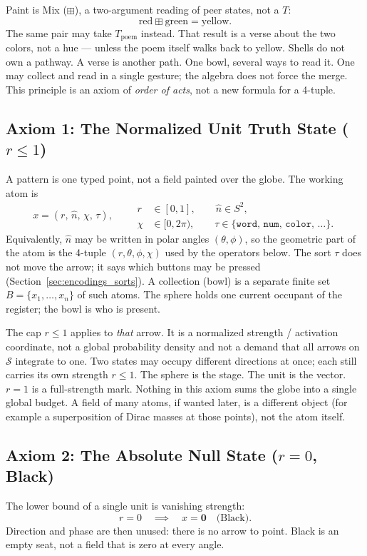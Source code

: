\documentclass[12pt, a4paper]{article}
\begin{document}
Paint is Mix ($\boxplus$), a two-argument reading of peer states, not a $T$:
\[
\mathrm{red}\boxplus\mathrm{green} = \mathrm{yellow}.
\]
The same pair may take $T_{\mathrm{poem}}$ instead. That result is a
verse about the two colors, not a hue --- unless the poem itself
walks back to yellow. Shells do not own a pathway. A verse is another
path. One bowl, several ways to read it. One may collect
and read in a single gesture; the algebra does not force the merge.
This principle is an axiom of \emph{order of acts}, not a new formula
for a 4-tuple.

\subsection{Axiom 1: The Normalized Unit Truth State ($r \le 1$)}
\label{subsec:axiom1}
A pattern is one typed point, not a field painted over the globe. The working atom is
\begin{equation}
    x = (r,\,\hat n,\,\chi,\,\tau),
    \qquad
    \begin{aligned}
    r &\in [0,1],
    \qquad
    \hat n \in S^2,\\
    \chi &\in [0,2\pi),
    \qquad
    \tau \in \{\mathtt{word},\,\mathtt{num},\,\mathtt{color},\,\ldots\}.
    \end{aligned}
    \label{eq:unit_truth}
\end{equation}
Equivalently, $\hat n$ may be written in polar angles $(\theta,\phi)$, so the geometric part of the atom is the 4-tuple $(r,\theta,\phi,\chi)$ used by the operators below. The sort $\tau$ does not move the arrow; it says which buttons may be pressed (Section~\ref{sec:encodings_sorts}). A collection (bowl) is a separate finite set $B=\{x_1,\ldots,x_n\}$ of such atoms. The sphere holds one current occupant of the register; the bowl is who is present.

The cap $r \le 1$ applies to \emph{that} arrow. It is a normalized strength / activation coordinate, not a global probability density and not a demand that all arrows on $\mathcal{S}$ integrate to one. Two states may occupy
different directions at once; each still carries its own strength
$r\le 1$. The sphere is the stage. The unit is the vector.
$r=1$ is a full-strength mark. Nothing in this axiom sums the globe
into a single global budget. A field of many atoms, if wanted later, is a different object (for example a superposition of Dirac masses at those points), not the atom itself.

\subsection{Axiom 2: The Absolute Null State ($r = 0$, Black)}
\label{subsec:axiom_null}
The lower bound of a single unit is vanishing strength:
\begin{equation}
    r = 0 \quad \implies \quad x = \mathbf{0}
    \quad \text{(Black)}.
    \label{eq:null_state}
\end{equation}
Direction and phase are then unused: there is no arrow to point.
Black is an empty seat, not a field that is zero at every angle.
\end{document}

